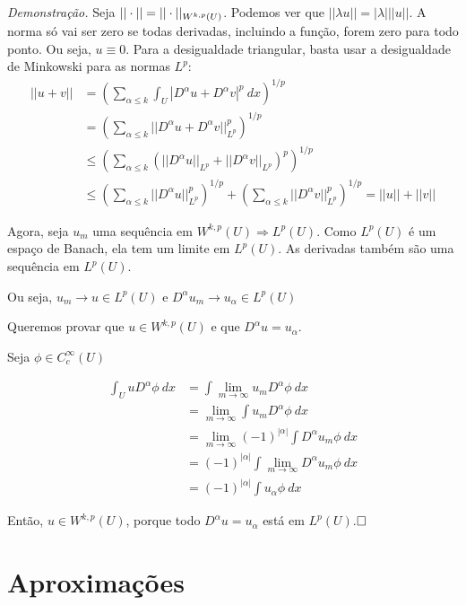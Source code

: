 \documentclass[11pt]{article}
\newcommand{\qed}{$\hfill\square$}
\begin{document}
\textit{Demonstração.} Seja \( || \cdot ||= ||\cdot ||_{W^{k,p}(U)} \). Podemos ver que \( ||\lambda u|| = |\lambda| ||u|| \). A norma só vai ser zero se todas derivadas, incluindo a função, forem zero para todo ponto. Ou seja, \( u \equiv 0 \). Para a desigualdade triangular, basta usar a desigualdade de Minkowski para as normas \( L^p \): \begin{align*}
	||u+v|| &= \left( \sum_{\alpha \leq k}\int_U | D^\alpha u + D^\alpha v |^p\ dx \right)^{1/p} \\
	&= \left( \sum_{\alpha \leq k} ||D^\alpha u+D^\alpha v||_{L^p}^p \right)^{1/p}\\
	&\leq  \left( \sum_{\alpha \leq k} (||D^\alpha u||_{L^p}+||D^\alpha v||_{L^p})^p \right)^{1/p}\\
	&\leq  \left( \sum_{\alpha \leq k} ||D^\alpha u||_{L^p}^p \right)^{1/p}+\left( \sum_{\alpha\leq k} ||D^\alpha v||_{L^p}^p \right)^{1/p} = ||u|| + ||v||
\end{align*}

Agora, seja \( u_m \) uma sequência em \( W^{k,p}(U)\Rightarrow L^p(U) \). Como \( L^p(U) \) é um espaço de Banach, ela tem um limite em \( L^p(U) \). As derivadas também são uma sequência em \( L^p(U) \).

Ou seja, \( u_m \rightarrow u \in L^p(U) \) e \( D^\alpha u_m \rightarrow u_{\alpha} \in L^p(U) \)

Queremos provar que \( u \in W^{k,p}(U) \) e que \( D^\alpha u = u_\alpha \).

Seja \( \phi \in C^\infty_c(U) \)

\begin{align*}
	\int_U u D^\alpha \phi\ dx &= \int \lim_{m \rightarrow \infty} u_m D^\alpha \phi \ dx	\\
	&= \lim_{m \rightarrow \infty} \int  u_m D^\alpha \phi \ dx	\\
	&= \lim_{m \rightarrow \infty} (-1)^{|\alpha| }\int D^\alpha  u_m \phi \ dx\\
	&= (-1)^{|\alpha| }\int  \lim_{m \rightarrow \infty} D^\alpha  u_m \phi \ dx		\\
	&= (-1)^{|\alpha| }\int  u_\alpha \phi \ dx
\end{align*}

Então, \( u \in W^{k,p}(U) \), porque todo \( D^\alpha u = u_\alpha \) está em \( L^p(U) \).\qed







\section{Aproximações}
\end{document}
